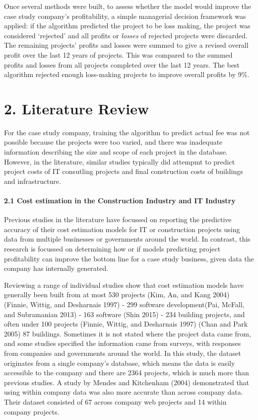 \documentclass[]{elsarticle} %
\begin{document}
Once several methods were built, to assess whether the model would
improve the case study company's profitability, a simple managerial
decision framework was applied: if the algorithm predicted the project
to be loss making, the project was considered `rejected' and all profits
or \emph{losses} of rejected projects were discarded. The remaining
projects' profits and losses were summed to give a revised overall
profit over the last 12 years of projects. This was compared to the
summed profits and losses from all projects completed over the last 12
years. The best algorithm rejected enough loss-making projects to
improve overall profits by 9\%.

\section{2. Literature Review}\label{literature-review}

For the case study company, training the algorithm to predict actual fee
was not possible because the projects were too varied, and there was
inadequate information describing the size and scope of each project in
the database. However, in the literature, similar studies typically did
attempmt to predict project costs of IT consutling projects and final
construction costs of buildings and infrastructure.

\paragraph{2.1 Cost estimation in the Construction Industry and IT
Industry}\label{cost-estimation-in-the-construction-industry-and-it-industry}

Previous studies in the literature have focussed on reporting the
predictive accuracy of their cost estimation models for IT or
construction projects using data from multiple businesses or governments
around the world. In contrast, this research is focussed on determining
how or if models predicting project profitability can improve the bottom
line for a case study business, given data the company has internally
generated.

Reviewing a range of individual studies show that cost estimation models
have generally been built from at most 530 projects (Kim, An, and Kang
2004) (Finnie, Wittig, and Desharnais 1997) - 299 software
development(Pai, McFall, and Subramanian 2013) - 163 software (Shin
2015) - 234 building projects, and often under 100 projects (Finnie,
Wittig, and Desharnais 1997) (Chan and Park 2005) 87 buildings.
Sometimes it is not stated where the project data came from, and some
studies specified the information came from surveys, with responses from
companies and governments around the world. In this study, the dataset
originates from a single company's database, which means the data is
easily accessible to the company and there are 2364 projects, which is
much more than previous studies. A study by Mendes and Kitchenham (2004)
demonstrated that using within company data was also more accurate than
across company data. Their dataset consisted of 67 across company web
projects and 14 within company projects.
\end{document}
